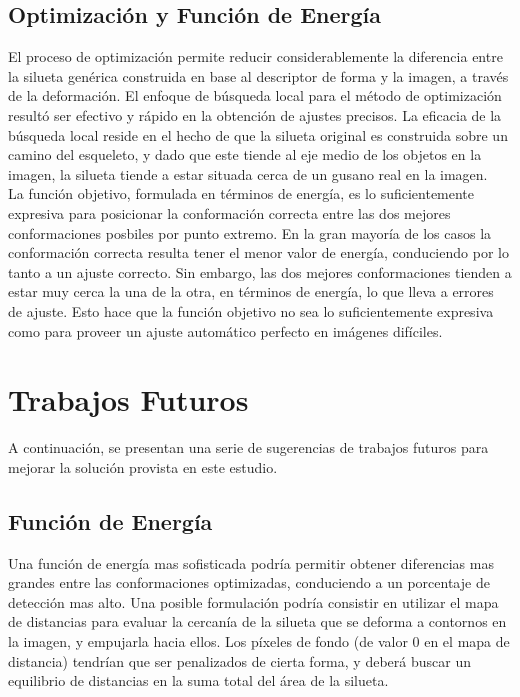 \subsection*{Optimizaci\'on y Funci\'on de Energ\'ia}

El proceso de optimizaci\'on permite reducir considerablemente la diferencia
entre la silueta gen\'erica construida en base al descriptor de forma y 
la imagen, a trav\'es de la deformaci\'on.
El enfoque de b\'usqueda local para el m\'etodo de optimizaci\'on 
result\'o ser efectivo y r\'apido en la obtenci\'on de ajustes precisos.
La eficacia de la b\'usqueda local reside en el hecho de que la silueta
original es construida sobre un camino del esqueleto, y dado que este
tiende al eje medio de los objetos en la imagen, la silueta tiende a 
estar situada cerca de un gusano real en la imagen.\\

La funci\'on objetivo, formulada en t\'erminos de energ\'ia, es lo 
suficientemente expresiva para posicionar la conformaci\'on correcta
entre las dos mejores conformaciones posbiles por punto extremo. En
la gran mayor\'ia de los casos la conformaci\'on correcta resulta
tener el menor valor de energ\'ia, conduciendo por lo tanto a un ajuste correcto.
Sin embargo, las dos mejores conformaciones tienden a estar muy cerca la una de la otra,
en t\'erminos de energ\'ia, lo que lleva a errores de ajuste. Esto hace que
la funci\'on objetivo no sea lo suficientemente expresiva como para proveer
un ajuste autom\'atico perfecto en im\'agenes dif\'iciles.

\section{Trabajos Futuros}

A continuaci\'on, se presentan una serie de sugerencias de trabajos
futuros para mejorar la soluci\'on provista en este estudio.

\subsection*{Funci\'on de Energ\'ia}

Una funci\'on de energ\'ia mas sofisticada podr\'ia permitir obtener diferencias
mas grandes entre las conformaciones optimizadas, conduciendo a un porcentaje
de detecci\'on mas alto. Una posible formulaci\'on podr\'ia consistir en utilizar
el mapa de distancias para evaluar la cercan\'ia de la silueta que se deforma
a contornos en la imagen, y empujarla hacia ellos. Los p\'ixeles de fondo
(de valor $0$ en el mapa de distancia) tendr\'ian que ser penalizados de cierta
forma, y deber\'a buscar un equilibrio de distancias en la suma total del \'area
de la silueta.

